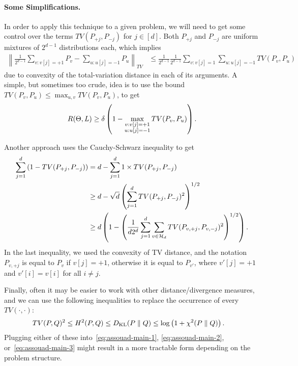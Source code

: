 \documentclass[12pt]{article}
\begin{document}
\paragraph{Some Simplifications.} In order to apply this technique to a given problem, we will need to get some control over the terms $TV(P_{+j}, P_{-j})$ for $j \in [d]$. Both $P_{+j}$  and $P_{-j}$ are uniform mixtures of $2^{d-1}$ distributions each, which implies
\begin{align}
\left\lVert \frac{1}{2^{d-1}} \sum_{v:v[j]=+1} P_v - \sum_{u:u[j]=-1} P_u \right\rVert_{TV} & \leq \frac{1}{2^{d-1}} \frac{1}{2^{d-1}} \sum_{v:v[j]=1} \sum_{u:u[j]=-1} TV(P_v,  P_u)
\end{align}
due to convexity of the total-variation distance in each of its arguments. A simple, but sometimes too crude, idea is to use the bound $TV(P_v,  P_u) \leq \max_{u, v} TV(P_v,  P_u)$, to get 
\begin{align}
	R(\Theta, L) \geq  \delta \left( 1-  \max_{\substack{v:v[j]=+1 \\ u:u[j]=-1}} TV(P_v,  P_u) \right). \label{eq:assouad-main-2}
\end{align}

Another approach uses the Cauchy-Schwarz inequality to get 
\begin{align}
	\sum_{j=1}^d \left( 1 - TV(P_{+j},  P_{-j}) \right) &= d - \sum_{j=1}^d 1 \times TV(P_{+j},  P_{-j}) \\
	& \geq d - \sqrt{d} \left( \sum_{j=1}^d  TV(P_{+j},  P_{-j})^2 \right)^{1/2} \\
	& \geq d \left( 1 - \left( \frac{1}{d 2^{d}} \sum_{j=1}^d\sum_{v \in {\cal H}_d} TV(P_{v, +j},  P_{v, -j})^2 \right)^{1/2}  \right).  \label{eq:assouad-main-3}
\end{align}
In the last inequality, we used the convexity of TV distance, and the notation $P_{v, +j}$ is equal to $P_v$ if $v[j]=+1$, otherwise it is equal to $P_{v'}$, where $v'[j]=+1$ and $v'[i]=v[i]$ for all $i \neq j$. 

Finally, often it may be easier to work with other distance/divergence measures, and we can use the following inequalities to replace the occurrence of every $TV(\cdot, \cdot)$: 
\begin{align}
	TV(P, Q)^2  &\leq H^2(P, Q) \leq D_{\text{KL}}(P \parallel Q)  \leq \log \left( 1 + \chi^2(P \parallel Q) \right). 
\end{align}
Plugging either of these into~\eqref{eq:assouad-main-1}, \eqref{eq:assouad-main-2}, or~\eqref{eq:assouad-main-3}  might result in a more tractable form depending on the problem structure. 
\end{document}
